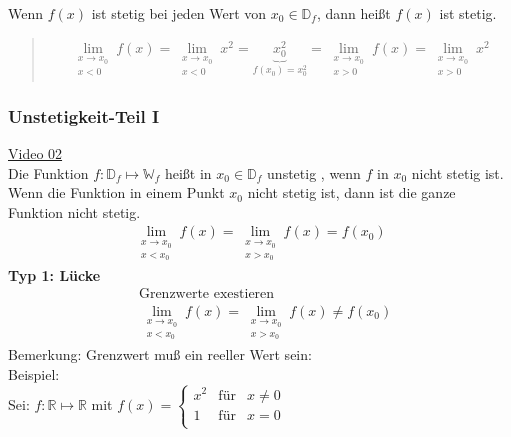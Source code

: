 \textbullet\;\; Wenn $ f(x) $ ist stetig bei jeden Wert von $ x_0\in\mathbb{D}_f$, dann heißt $ f(x) $ ist stetig.\\
\begin{quote}
	\begin{align*}
	\lim\limits_ {\substack{x \to x_0\\x<0}}f(x)=	\lim\limits_ {\substack{x \to x_0\\x<0}}x^2=\underbrace {x_0^2}_{f(x_0)=x_0^2}=\lim\limits_ {\substack{x \to x_0\\x>0}}f(x)=	\lim\limits_ {\substack{x \to x_0\\x>0}}x^2
	\end{align*}
	
	
\end{quote}
\subsubsection{Unstetigkeit-Teil I}
\href{https://youtu.be/KsP333nJ9PY}{Video 02}\\
Die Funktion $ f:\mathbb{D}_f\longmapsto\mathbb{W}_f $ heißt in $ x_0 \in \mathbb{D}_f $ unstetig , wenn $ f $ in $ x_0 $ nicht stetig ist.\\
Wenn die Funktion in einem Punkt $ x_0 $ nicht stetig ist, dann ist die ganze Funktion nicht stetig.\\
\begin{align*}
\boxed{\lim\limits_ {\substack{x\to x_0\\x<x_0}}f(x)=\lim\limits_ {\substack{x\to x_0\\x>x_0}}f(x)=f(x_0)}
\end{align*}
\textbf{Typ 1: Lücke}\\
\begin{align*}
&\text{Grenzwerte exestieren }\\
&\boxed{\lim\limits_ {\substack{x\to x_0\\x<x_0}}f(x)=\lim\limits_ {\substack{x\to x_0\\x>x_0}}f(x)\neq f(x_0)}
\end{align*}
Bemerkung: Grenzwert muß ein reeller Wert sein:\vspace*{2mm}\\
Beispiel:\\
Sei: $ f:\mathbb{R}\longmapsto \mathbb{R} $ mit $ f(x) =     \left\{ \begin{array}{rcl}
x^2& \mbox{für} & x\neq0\\
1& \mbox{für} & x= 0 \\

\end{array}\right. $\\
